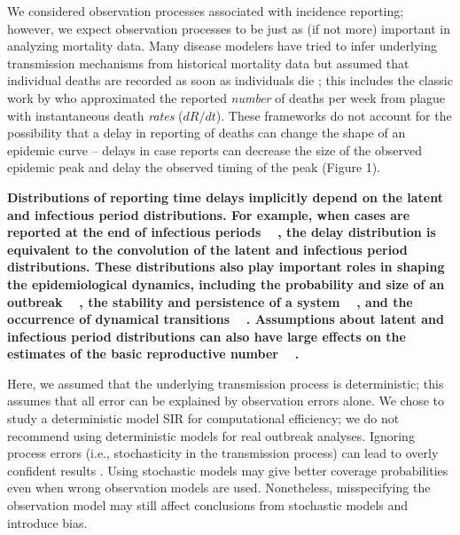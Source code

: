 \documentclass[12pt]{article}\usepackage[]{graphicx}\usepackage[]{color}
\providecommand{\DIFaddtex}[1]{{\protect\color{blue}\textbf{#1}}} %
\providecommand{\DIFaddbegin}{} %
\providecommand{\DIFaddend}{} %
\providecommand{\DIFadd}[1]{\texorpdfstring{\DIFaddtex{#1}}{#1}} %
\newcommand{\DIFaddincludegraphics}[2][]{{\color{blue}\fbox{\DIFOincludegraphics[#1]{#2}}}} %
\DeclareRobustCommand{\DIFaddbegin}{\DIFOaddbegin \let\includegraphics\DIFaddincludegraphics} %
\DeclareRobustCommand{\DIFaddend}{\DIFOaddend \let\includegraphics\DIFOincludegraphics} %
\begin{document}
We considered observation processes associated with incidence 
reporting; however, we expect observation processes to be just as 
(if not more) important in analyzing mortality data. Many disease modelers have
tried to infer underlying transmission mechanisms from historical mortality 
data but assumed that individual deaths are recorded as soon as individuals die 
\citep{he2013inferring, didelot2017model, dean2018human}; this includes the classic work by
\cite{kermack1927contribution} who approximated the reported \emph{number} of
deaths per week from plague with instantaneous death \emph{rates} ($dR/dt$).
These frameworks do not account for the possibility 
that a delay in reporting of deaths can
change the shape of an epidemic curve -- delays in case reports can decrease
the size of the observed epidemic peak and delay the observed timing of the peak (Figure 1). 

\DIFaddbegin \DIFadd{Distributions of reporting time delays implicitly depend on the latent and infectious 
period distributions. For example, when cases are reported
at the end of infectious periods \mbox{%
\citep{breto2009time, he2009plug, lin2016seasonality}}\hspace{0pt}%
,
the delay distribution is equivalent to the convolution of the latent and
infectious period distributions. These distributions also play important roles in 
shaping the epidemiological dynamics,
including the probability and size of an outbreak
\mbox{%
\citep{anderson1980spread}}\hspace{0pt}%
, the stability and persistence of a system
\mbox{%
\citep{keeling1998effect, lloyd2001destabilization, lloyd2001realistic}}\hspace{0pt}%
,
and the  occurrence of dynamical transitions \mbox{%
\citep{krylova2013effects}}\hspace{0pt}%
.
Assumptions about latent and infectious period distributions can also have large effects on the estimates of the basic reproductive number \mbox{%
\citep{wearing2005appropriate}}\hspace{0pt}%
.
}

\DIFaddend Here, we assumed that the underlying transmission process is deterministic; this 
assumes that all error can be explained by observation errors alone. 
We chose to study a deterministic model SIR for computational efficiency; 
we do not recommend using deterministic models for real outbreak analyses.
Ignoring process errors (i.e., stochasticity in the transmission process) can lead to
overly confident results \citep{king2015avoidable}. Using stochastic models may
give better coverage probabilities even when wrong observation models are used.
Nonetheless, misspecifying the observation model may still affect conclusions from 
stochastic models and introduce bias.
\end{document}
